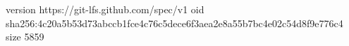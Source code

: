 version https://git-lfs.github.com/spec/v1
oid sha256:4c20a5b53d73abccb1fce4c76c5dece6f3aea2e8a55b7bc4e02c54d8f9e776c4
size 5859
